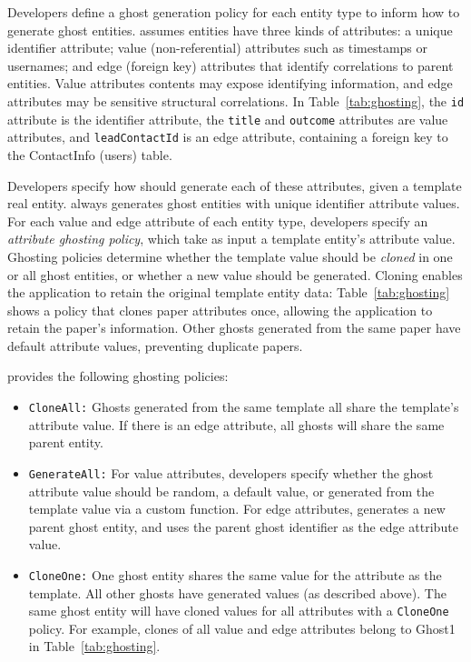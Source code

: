 Developers define a ghost generation policy for each entity type to
inform \sys how to generate ghost entities.
\sys assumes entities have three kinds of attributes: a unique identifier attribute; value
(non-referential) attributes such as timestamps or usernames; and edge (foreign key)
attributes that identify correlations to parent entities.  Value attributes contents may expose
identifying information, and edge attributes may be sensitive structural correlations.
In Table~\ref{tab:ghosting}, the \texttt{id} attribute is the identifier attribute, the
\texttt{title} and \texttt{outcome} attributes are value attributes, and \texttt{leadContactId} is
an edge attribute, containing a foreign key to the ContactInfo (users) table. 

Developers specify how \sys should generate each of these attributes, given a template real
entity.
\sys always generates ghost entities with unique identifier attribute values.
For each value and edge attribute of each entity type, developers specify an \emph{attribute ghosting policy},
which take as input a template entity's attribute value. Ghosting policies determine whether the
template value should be \emph{cloned} in one or all ghost entities, or whether
a new value should be generated. Cloning enables the application to retain
the original template entity data: Table~\ref{tab:ghosting} shows a policy that clones
paper attributes once, allowing the application to retain the paper's information. Other ghosts
generated from the same paper have default attribute values, preventing duplicate papers.

\sys provides the following ghosting policies:
\begin{itemize}
    \item \texttt{CloneAll:} Ghosts generated from the same template all share the template's 
        attribute value. If there is an edge attribute, all ghosts will share the
        same parent entity.

    \item \texttt{GenerateAll:} 
        For value attributes, developers specify whether the ghost attribute value should be
        random, a default value, or generated from the template value via a custom function.
        For edge attributes, \sys generates a new parent ghost entity, and uses the parent ghost
        identifier as the edge attribute value.

    \item \texttt{CloneOne:} One ghost entity shares the same value for the attribute as the
        template. All other ghosts have generated values (as described above).
        The same ghost entity will have cloned values for all attributes with a
        \texttt{CloneOne} policy. For example, clones of all value and edge attributes belong to
        Ghost1 in Table~\ref{tab:ghosting}.
\end{itemize}

